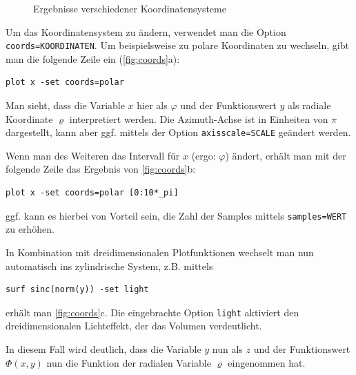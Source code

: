 \documentclass[DIV=14,headsepline,footsepline]{scrbook}
\begin{document}
\begin{figure}[htb]
					\caption{Ergebnisse verschiedener Koordinatensysteme}
					\label{fig:coords}
				\end{figure}
				
				Um das Koordinatensystem zu ändern, verwendet man die Option \verb+coords=KOORDINATEN+. Um beispielsweise zu polare Koordinaten zu wechseln, gibt man die folgende Zeile ein (\autoref{fig:coords}a):
				\begin{lstlisting}
plot x -set coords=polar
				\end{lstlisting}
				
				Man sieht, dass die Variable $x$ hier als $\varphi$ und der Funktionswert $y$ als radiale Koordinate $\varrho$ interpretiert werden. Die Azimuth-Achse ist in Einheiten von $\pi$ dargestellt, kann aber ggf. mittels der Option \verb+axisscale=SCALE+ geändert werden.
				
				Wenn man des Weiteren das Intervall für $x$ (ergo: $\varphi$) ändert, erhält man mit der folgende Zeile das Ergebnis von \autoref{fig:coords}b:
				\begin{lstlisting}
plot x -set coords=polar [0:10*_pi]
				\end{lstlisting}
				ggf. kann es hierbei von Vorteil sein, die Zahl der Samples mittels \verb+samples=WERT+ zu erhöhen.
				
				In Kombination mit dreidimensionalen Plotfunktionen wechselt man nun automatisch ins zylindrische System, z.B. mittels 
				\begin{lstlisting}
surf sinc(norm(y)) -set light
				\end{lstlisting}
				erhält man \autoref{fig:coords}c. Die eingebrachte Option \verb+light+ aktiviert den dreidimensionalen Lichteffekt, der das Volumen verdeutlicht.
				
				In diesem Fall wird deutlich, dass die Variable $y$ nun als $z$ und der Funktionswert $\Phi(x,y)$ nun die Funktion der radialen Variable $\varrho$ eingenommen hat.
				
\end{document}
